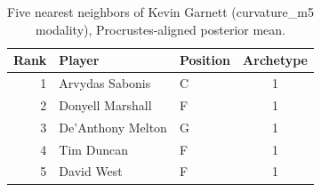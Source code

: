 \begin{table}[htbp]
  \centering\small
  \begin{tabular}{rllc}
    \toprule
    Rank & Player & Position & Archetype \\
    \midrule
    1 & Arvydas Sabonis & C & 1 \\
    2 & Donyell Marshall & F & 1 \\
    3 & De'Anthony Melton & G & 1 \\
    4 & Tim Duncan & F & 1 \\
    5 & David West & F & 1 \\
    \bottomrule
  \end{tabular}
  \caption{Five nearest neighbors of Kevin Garnett (curvature_m5 modality), Procrustes-aligned posterior mean.}
  \label{tab:Kevin_Garnett_neighbors_curvature_m5}
\end{table}

